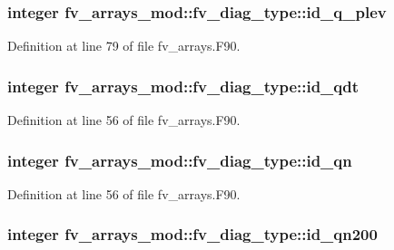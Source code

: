 \subsubsection[{id\-\_\-q\-\_\-plev}]{\setlength{\rightskip}{0pt plus 5cm}integer fv\-\_\-arrays\-\_\-mod\-::fv\-\_\-diag\-\_\-type\-::id\-\_\-q\-\_\-plev}\label{structfv__arrays__mod_1_1fv__diag__type_ac8f310e21828d67bb18b441b2561cfb1}


Definition at line 79 of file fv\-\_\-arrays.\-F90.

\subsubsection[{id\-\_\-qdt}]{\setlength{\rightskip}{0pt plus 5cm}integer fv\-\_\-arrays\-\_\-mod\-::fv\-\_\-diag\-\_\-type\-::id\-\_\-qdt}\label{structfv__arrays__mod_1_1fv__diag__type_ad92e28970ee28309de798b093743587c}


Definition at line 56 of file fv\-\_\-arrays.\-F90.

\subsubsection[{id\-\_\-qn}]{\setlength{\rightskip}{0pt plus 5cm}integer fv\-\_\-arrays\-\_\-mod\-::fv\-\_\-diag\-\_\-type\-::id\-\_\-qn}\label{structfv__arrays__mod_1_1fv__diag__type_a2a3f51e805a19792249f18610e7a0ef3}


Definition at line 56 of file fv\-\_\-arrays.\-F90.

\subsubsection[{id\-\_\-qn200}]{\setlength{\rightskip}{0pt plus 5cm}integer fv\-\_\-arrays\-\_\-mod\-::fv\-\_\-diag\-\_\-type\-::id\-\_\-qn200}\label{structfv__arrays__mod_1_1fv__diag__type_a7a48b4be892c914fe0ba91908258bfce}


